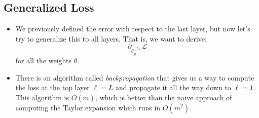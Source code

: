 \subsection{Generalized Loss}
\begin{itemize}
	\item We previously defined the error with respect to the last layer, but now
		let's try to generalize this to all layers. That is, we want to derive:
		\[
			\partial_{\theta_{ji}^{(l)}}\mathcal{L}
		\]
		for all the weights \( \theta \).  
	\item There is an algorithm called \textit{backpropagation} that gives us a way
		to compute the loss at the top layer \( \ell = L \) and propagate it all the
		way down to \( \ell = 1 \). This algorithm is \( O(m) \), which is better
		than the naive approach of computing the Taylor expansion which runs in \(
		O(m^2) \). 
\end{itemize}
